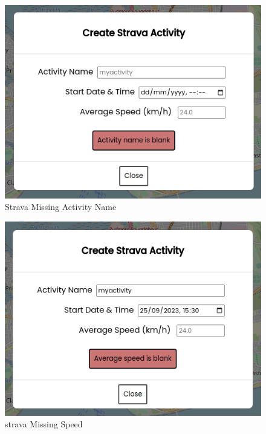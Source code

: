 \begin{figure}[!ht]
    \centering
    \includegraphics[width=425px]{figures/Progress Images/Iteration-2/SR18/SR18 Create Activity Fail - Missing Activity Name.png}
    \caption{Strava Missing Activity Name}
    \label{fig:missing-activity-name-strava}
\end{figure}

\begin{figure}[!ht]
    \centering
    \includegraphics[width=425px]{figures/Progress Images/Iteration-2/SR18/SR18 Create Activity Fail - Missing Avg Speed.png}
    \caption{strava Missing Speed}
    \label{fig:missing-activity-speed-strava}
\end{figure}

